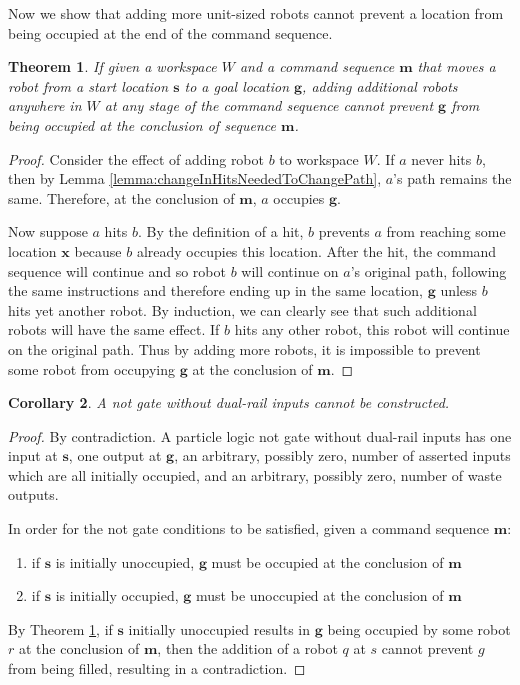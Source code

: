 \documentclass[letterpaper, 10 pt, conference]{ieeeconf}
\newtheorem{theorem}{Theorem}
\newtheorem{corollary}[theorem]{Corollary}
\begin{document}
Now we show that adding more unit-sized robots cannot prevent a location from being occupied at the end of the command sequence.

\begin{theorem}\label{thm:AdditionalRobotsCannotPreventAnOccupation}
If given a workspace $W$ and a command sequence $\bm{m}$ that moves a robot from a start location $\bm{s}$ to a goal location $\bm{g}$, adding additional robots anywhere in $W$ at any stage of the command sequence cannot prevent $\bm{g}$ from being occupied at the conclusion of sequence $\bm{m}$.
\end{theorem}

\begin{proof} Consider the effect of adding robot $b$ to workspace $W$. If $a$ never hits $b$, then by Lemma \ref{lemma:changeInHitsNeededToChangePath}, $a$'s path remains the same. Therefore, at the conclusion of $\bm{m}$, $a$ occupies $\bm{g}$. 

Now suppose $a$ hits $b$. By the definition of a hit, $b$ prevents $a$ from reaching some location $\bm{x}$ because $b$ already occupies this location. After the hit, the command sequence will continue and so robot $b$ will continue on $a$'s original path, following the same instructions and therefore ending up in the same location, $\bm{g}$ unless $b$ hits yet another robot. By induction, we can clearly see that such additional robots will have the same effect. If $b$ hits any other robot, this robot will continue on the original path. Thus by adding more robots, it is impossible to prevent some robot from occupying $\bm{g}$ at the conclusion of $\bm{m}$.  
\end{proof}

\begin{corollary}
A  {\sc not} gate without dual-rail inputs cannot be constructed.
\end{corollary}
\begin{proof}
By contradiction.
A particle logic {\sc not} gate without dual-rail inputs has one input at $\bm{s}$, one output at $\bm{g}$, an arbitrary, possibly zero, number of asserted inputs which are all initially occupied, and an arbitrary, possibly zero, number of waste outputs.

In order for the {\sc not} gate conditions to be satisfied, given a command sequence $\bm{m}$:  
\begin{enumerate}
\item if $\bm{s}$ is initially unoccupied, $\bm{g}$ must be occupied at the conclusion of $\bm{m}$
\item if $\bm{s}$ is initially occupied, $\bm{g}$ must be unoccupied at the conclusion of $\bm{m}$ 
\end{enumerate}
By Theorem \ref{thm:AdditionalRobotsCannotPreventAnOccupation}, if $\bm{s}$ initially unoccupied results in $\bm{g}$ being occupied by some robot $r$ at the conclusion of $\bm{m}$, then the addition of a robot $q$ at $s$ cannot prevent $g$ from being filled, resulting in a contradiction.
\end{proof}
\end{document}
